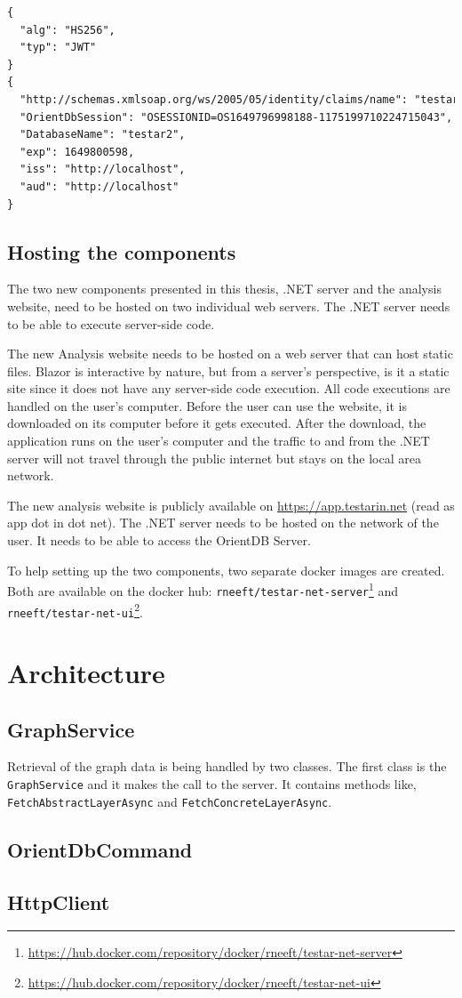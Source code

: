 \begin{lstlisting}[language=xml, caption=Decoded JWT header and Payload of the JWT given in listing \ref{code:jwt}, label=code:jwt-payload]
{
  "alg": "HS256",
  "typ": "JWT"
}
{
  "http://schemas.xmlsoap.org/ws/2005/05/identity/claims/name": "testar",
  "OrientDbSession": "OSESSIONID=OS1649796998188-1175199710224715043",
  "DatabaseName": "testar2",
  "exp": 1649800598,
  "iss": "http://localhost",
  "aud": "http://localhost"
}
\end{lstlisting}

\subsection{Hosting the components}
The two new components presented in this thesis, .NET server and the \testar analysis website, need to be hosted on two individual web servers. The .NET server needs to be able to execute server-side code. 

The new \testar Analysis website needs to be hosted on a web server that can host static files. Blazor is interactive by nature, but from a server's perspective, is it a static site since it does not have any server-side code execution. All code executions are handled on the user's computer. Before the user can use the website, it is downloaded on its computer before it gets executed. After the download, the application runs on the user's computer and the traffic to and from the .NET server will not travel through the public internet but stays on the local area network. 

The new \testar analysis website is publicly available on \url{https://app.testarin.net} (read as app dot \testar in dot net). The .NET server needs to be hosted on the network of the user. It needs to be able to access the OrientDB Server. 

To help setting up the two components, two separate docker images are created. Both are available on the docker hub: \verb|rneeft/testar-net-server|\footnote{\url{https://hub.docker.com/repository/docker/rneeft/testar-net-server}} and \verb|rneeft/testar-net-ui|\footnote{\url{https://hub.docker.com/repository/docker/rneeft/testar-net-ui}}.

\section{Architecture}

\subsection{GraphService} \label{sec:the-graph-service}

Retrieval of the graph data is being handled by two classes. The first class is the \verb|GraphService| and it makes the call to the server. It contains methods like, \verb|FetchAbstractLayerAsync| and \verb|FetchConcreteLayerAsync|. 

\subsection{OrientDbCommand}

\subsection{HttpClient}
